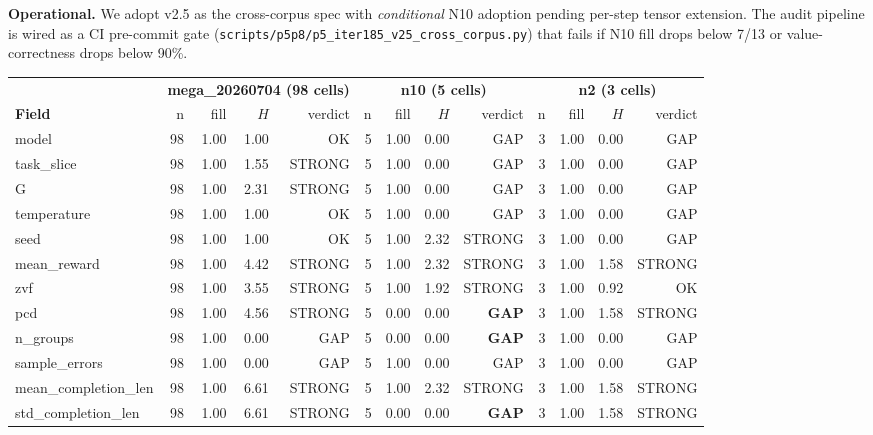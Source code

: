 \documentclass{article}  \usepackage[preprint,nonatbib]{neurips_2026} \usepackage[numbers]{natbib}
\begin{document}
\textbf{Operational.}
We adopt v2.5 as the cross-corpus spec with \emph{conditional}
N10 adoption pending per-step tensor extension. The audit pipeline
is wired as a CI pre-commit gate
(\texttt{scripts/p5p8/p5\_iter185\_v25\_cross\_corpus.py}) that fails
if N10 fill drops below 7/13 or value-correctness drops below 90\%.

\begin{table}[t]
\centering
\small
\begin{tabular}{l r r r r r r r r r r r r}
\toprule
& \multicolumn{4}{c}{\textbf{mega\_20260704 (98 cells)}} & \multicolumn{4}{c}{\textbf{n10 (5 cells)}} & \multicolumn{4}{c}{\textbf{n2 (3 cells)}} \\
\cmidrule(lr){2-5}\cmidrule(lr){6-9}\cmidrule(lr){10-13}
\textbf{Field} & n & fill & $H$ & verdict & n & fill & $H$ & verdict & n & fill & $H$ & verdict \\
\midrule
model                & 98 & 1.00 & 1.00 & OK   & 5 & 1.00 & 0.00 & GAP    & 3 & 1.00 & 0.00 & GAP \\
task\_slice           & 98 & 1.00 & 1.55 & STRONG & 5 & 1.00 & 0.00 & GAP    & 3 & 1.00 & 0.00 & GAP \\
G                    & 98 & 1.00 & 2.31 & STRONG & 5 & 1.00 & 0.00 & GAP    & 3 & 1.00 & 0.00 & GAP \\
temperature          & 98 & 1.00 & 1.00 & OK   & 5 & 1.00 & 0.00 & GAP    & 3 & 1.00 & 0.00 & GAP \\
seed                 & 98 & 1.00 & 1.00 & OK   & 5 & 1.00 & 2.32 & STRONG & 3 & 1.00 & 0.00 & GAP \\
mean\_reward          & 98 & 1.00 & 4.42 & STRONG & 5 & 1.00 & 2.32 & STRONG & 3 & 1.00 & 1.58 & STRONG \\
zvf                  & 98 & 1.00 & 3.55 & STRONG & 5 & 1.00 & 1.92 & STRONG & 3 & 1.00 & 0.92 & OK \\
pcd                  & 98 & 1.00 & 4.56 & STRONG & 5 & 0.00 & 0.00 & \textbf{GAP}    & 3 & 1.00 & 1.58 & STRONG \\
n\_groups             & 98 & 1.00 & 0.00 & GAP  & 5 & 0.00 & 0.00 & \textbf{GAP}    & 3 & 1.00 & 0.00 & GAP \\
sample\_errors        & 98 & 1.00 & 0.00 & GAP  & 5 & 1.00 & 0.00 & GAP    & 3 & 1.00 & 0.00 & GAP \\
mean\_completion\_len  & 98 & 1.00 & 6.61 & STRONG & 5 & 1.00 & 2.32 & STRONG & 3 & 1.00 & 1.58 & STRONG \\
std\_completion\_len   & 98 & 1.00 & 6.61 & STRONG & 5 & 0.00 & 0.00 & \textbf{GAP}    & 3 & 1.00 & 1.58 & STRONG \\

\end{tabular}
\end{table}
\end{document}
